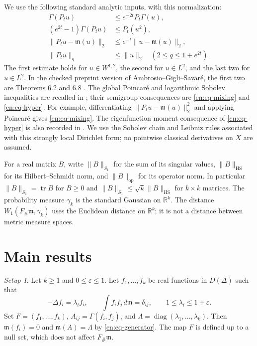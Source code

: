 \documentclass[12pt]{amsart}
\theoremstyle{definition}
\theoremstyle{remark}
\newtheorem{setup}[thm]{Setup}
\numberwithin{equation}{section}
\DeclareMathOperator{\tr}{tr}
\newcommand{\R}{\mathbb{R}}
\newcommand{\m}{\mathfrak m}
\theoremstyle{jpplain}
\begin{document}
We use the following standard analytic inputs, with this normalization:
\begin{align}
 \Gamma(P_tu)&\leq e^{-2t}P_t\Gamma(u),\label{en:eq-BE}\\
 (e^{2t}-1)\Gamma(P_tu)&\leq P_t(u^2),\label{en:eq-reverse}\\
 \|P_tu-\m(u)\|_2&\leq e^{-t}\|u-\m(u)\|_2,\label{en:eq-mixing}\\
 \|P_tu\|_q&\leq\|u\|_2\quad(2\leq q\leq1+e^{2t}).\label{en:eq-hyper}
\end{align}
The first estimate holds for $u\in W^{1,2}$, the second for $u\in L^2$,
and the last two for $u\in L^2$.  In the checked preprint version of
Ambrosio--Gigli--Savaré, the first two are Theorems 6.2 and 6.8
\cite{en:AGS}.  The global Poincaré and logarithmic Sobolev inequalities
are recalled in \cite[\S2.1]{en:GKKO}; their semigroup consequences are
\eqref{en:eq-mixing} and \eqref{en:eq-hyper}.  For example, differentiating
$\|P_tu-\m(u)\|_2^2$ and applying Poincaré gives
\eqref{en:eq-mixing}.  The eigenfunction moment consequence of
\eqref{en:eq-hyper} is also recorded in \cite[Proposition 3.2(i)]{en:BF}.
We use the Sobolev chain and Leibniz rules associated with this strongly
local Dirichlet form; no pointwise classical derivatives on $X$ are assumed.

For a real matrix $B$, write $\|B\|_{S_1}$ for the sum of its singular
values, $\|B\|_{\mathrm{HS}}$ for its Hilbert--Schmidt norm, and
$\|B\|_{\mathrm{op}}$ for its operator norm.  In particular
$\|B\|_{S_1}=\tr B$ for $B\geq0$ and
$\|B\|_{S_1}\leq\sqrt{k}\|B\|_{\mathrm{HS}}$ for $k\times k$ matrices.
The probability measure $\gamma_k$ is the standard Gaussian on $\R^k$.
The distance $W_1(F_\#\m,\gamma_k)$ uses the Euclidean distance on $\R^k$;
it is not a distance between metric measure spaces.

\section{Main results}

\begin{setup}\label{en:setup}
Let $k\geq1$ and $0\leq\varepsilon\leq1$.  Let $f_1,\ldots,f_k$ be real
functions in $D(\Delta)$ such that
\begin{equation}\label{en:eq-eigen}
 -\Delta f_i=\lambda_i f_i,\qquad
 \int f_i f_j\,d\m=\delta_{ij},\qquad
 1\leq\lambda_i\leq1+\varepsilon.
\end{equation}
Set $F=(f_1,\ldots,f_k)$,
$A_{ij}=\Gamma(f_i,f_j)$, and
$\Lambda=\operatorname{diag}(\lambda_1,\ldots,\lambda_k)$.
Then $\m(f_i)=0$ and $\m(A)=\Lambda$ by
\eqref{en:eq-generator}.  The map $F$ is defined up to a null set, which
does not affect $F_\#\m$.
\end{setup}
\end{document}
